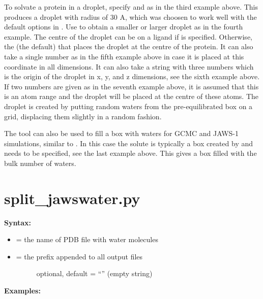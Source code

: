 \documentclass[letterpaper,10pt,english]{manual}
\begin{document}
To solvate a protein in a droplet, specify  and  as in the third example above. This produces a droplet with radius of 30 A, which was choosen to work well with the default options in . Use  to obtain a smaller or larger droplet as in the fourth example. The centre of the droplet can be on a ligand if  is specified. Otherwise, the  (the default) that places the droplet at the centre of the protein. It can also take a single number as in the fifth example above in case it is placed at this coordinate in all dimensions. It can also take a string with three numbers which is the origin of the droplet in x, y, and z dimensions, see the sixth example above. If two numbers are given as in the seventh example above, it is assumed that this is an atom range and the droplet will be placed at the centre of these atoms. The droplet is created by putting random waters from the pre-equilibrated box on a grid, displacing them slightly in a random fashion.

The tool can also be used to fill a box with waters for GCMC and JAWS-1 simulations, similar to . In this case the solute is typically a box created by  and  needs to be specified, see the last example above. This gives a box filled with the bulk number of waters.


\section{split\_jawswater.py}

\textbf{Syntax:}

\begin{itemize}
\item {} 
 = the name of PDB file with water molecules

\item {} \begin{description}
\item[{ = the prefix appended to all output files}] \leavevmode
optional, default = ``'' (empty string)

\end{description}

\end{itemize}

\textbf{Examples:}
\end{document}
